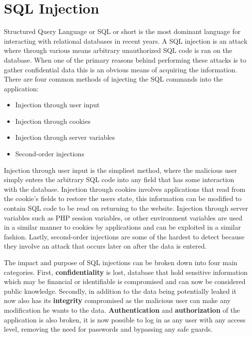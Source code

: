 \section{SQL Injection}
Structured Query Language or SQL or short is the most dominant language for interacting with relational databases in recent years.  A SQL injection is an attack where through various means arbitrary unauthorized SQL code is ran on the database.  When one of the primary reasons behind performing these attacks is to gather confidential data this is an obvious means of acquiring the information.%
There are four common methods of injecting the SQL commands into the application:

\begin{itemize}
	\item Injection through user input
	\item Injection through cookies
	\item Injection through server variables
	\item Second-order injections
\end{itemize}

Injection through user input is the simpliest method, where the malicious user simply enters the arbitrary SQL code into any field that has some interaction with the database.  Injection through cookies involves applications that read from the cookie's fields to restore the users state, this information can be modified to contain SQL code to be read on returning to the website.  Injection through server variables such as PHP session variables, or other environment variables are used in a similar manner to cookies by applications and can be exploited in a similar fashion.  Lastly, second-order injections are some of the hardest to detect because they involve an attack that occurs later on after the data is entered. %

The impact and purpose of SQL injections can be broken down into four main categories.  First, \textbf{confidentiality} is lost, database that hold sensitive information which may be financial or identifiable is compromised and can now be considered public knowledge.  Secondly, in addition to the data being potentially leaked it now also has its \textbf{integrity} compromised as the malicious user can make any modification he wants to the data.  \textbf{Authentication} and \textbf{authorization} of the application is also broken, it is now possible to log in as any user with any access level, removing the need for passwords and bypassing any safe guards.

